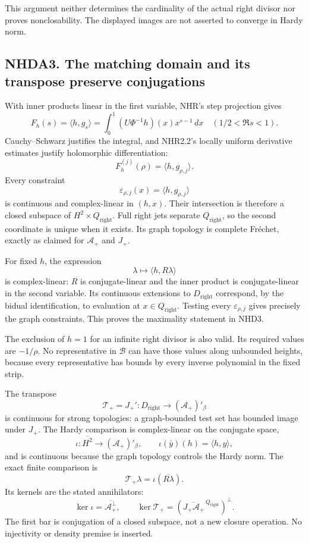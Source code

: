 This argument neither determines the cardinality of the actual right
divisor nor proves nonclosability. The displayed images are not asserted
to converge in Hardy norm.

\subsection{NHDA3. The matching domain and its transpose preserve
conjugations}\label{nhda3.-the-matching-domain-and-its-transpose-preserve-conjugations}

With inner products linear in the first variable, NHR's step projection
gives \[
F_h(s)=\langle h,g_s\rangle
=\int_0^1 (U\Phi^{-1}h)(x)x^{s-1}\,dx
\quad(1/2<\Re s<1).
\] Cauchy--Schwarz justifies the integral, and NHR2.2's locally uniform
derivative estimates justify holomorphic differentiation: \[
F_h^{(j)}(\rho)=\langle h,g_{\rho,j}\rangle.
\] Every constraint \[
\varepsilon_{\rho,j}(x)=\langle h,g_{\rho,j}\rangle
\] is continuous and complex-linear in \((h,x)\). Their intersection is
therefore a closed subspace of \(H^2\times Q_{\mathrm{right}}\). Full
right jets separate \(Q_{\mathrm{right}}\), so the second coordinate is
unique when it exists. Its graph topology is complete Fréchet, exactly
as claimed for \(\mathscr A_+\) and \(J_+\).

For fixed \(h\), the expression \[
\lambda\longmapsto\langle h,R\lambda\rangle
\] is complex-linear: \(R\) is conjugate-linear and the inner product is
conjugate-linear in the second variable. Its continuous extensions to
\(D_{\mathrm{right}}\) correspond, by the bidual identification, to
evaluation at \(x\in Q_{\mathrm{right}}\). Testing every
\(\varepsilon_{\rho,j}\) gives precisely the graph constraints. This
proves the maximality statement in NHD3.

The exclusion of \(h=1\) for an infinite right divisor is also valid.
Its required values are \(-1/\rho\). No representative in \(\mathcal B\)
can have those values along unbounded heights, because every
representative has bounds by every inverse polynomial in the fixed
strip.

The transpose \[
\mathcal T_+=J_+':
D_{\mathrm{right}}\to(\mathscr A_+)'_\beta
\] is continuous for strong topologies: a graph-bounded test set has
bounded image under \(J_+\). The Hardy comparison is complex-linear on
the conjugate space, \[
\iota:\overline{H^2}\to(\mathscr A_+)'_\beta,
\qquad
\iota(\bar y)(h)=\langle h,y\rangle,
\] and is continuous because the graph topology controls the Hardy norm.
The exact finite comparison is \[
\mathcal T_+\lambda=\iota(\overline{R\lambda}).
\] Its kernels are the stated annihilators: \[
\ker\iota=\overline{\mathscr A_+^\perp},
\qquad
\ker\mathcal T_+
=(\overline{J_+\mathscr A_+}^{\,Q_{\mathrm{right}}})^\perp.
\] The first bar is conjugation of a closed subspace, not a new closure
operation. No injectivity or density premise is inserted.

